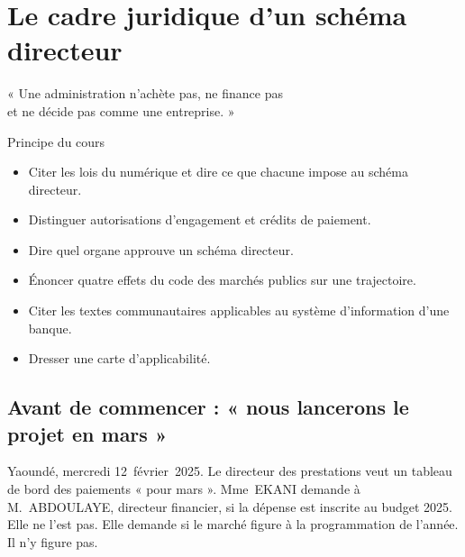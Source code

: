 
\chapter{Le cadre juridique d'un schéma directeur}
\label{chap:droit}

\epigraph{%
    « Une administration n'achète pas, ne finance pas\\
    et ne décide pas comme une entreprise. »%
}{Principe du cours}


\begin{boxobjectifs}
\begin{itemize}
    \item Citer les lois du numérique et dire ce que chacune impose au schéma directeur.
    \item Distinguer autorisations d'engagement et crédits de paiement.
    \item Dire quel organe approuve un schéma directeur.
    \item Énoncer quatre effets du code des marchés publics sur une trajectoire.
    \item Citer les textes communautaires applicables au système d'information d'une banque.
    \item Dresser une carte d'applicabilité.
\end{itemize}
\end{boxobjectifs}

\bigskip

\section*{Avant de commencer : « nous lancerons le projet en mars »}

Yaoundé, mercredi 12~février~2025. Le directeur des prestations veut un tableau de bord des paiements « pour
mars ». Mme~EKANI demande à M.~ABDOULAYE, directeur financier, si la dépense est inscrite au budget 2025. Elle ne
l'est pas. Elle demande si le marché figure à la programmation de l'année. Il n'y figure pas.

